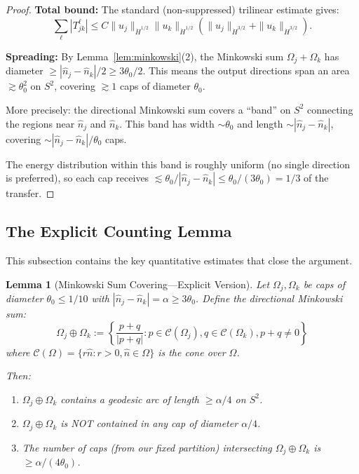 \documentclass[11pt]{article}
\newtheorem{lemma}[theorem]{Lemma}
\theoremstyle{definition}
\begin{document}
\begin{proof}
\textbf{Total bound:} The standard (non-suppressed) trilinear estimate gives:
\begin{equation}
\sum_\ell |T_{jk}^\ell| \leq C \|u_j\|_{\dot{H}^{1/2}} \|u_k\|_{\dot{H}^{1/2}} (\|u_j\|_{\dot{H}^{3/2}} + \|u_k\|_{\dot{H}^{3/2}}).
\end{equation}

\textbf{Spreading:} By Lemma~\ref{lem:minkowski}(2), the Minkowski sum $\Omega_j + \Omega_k$ has diameter $\geq |\hat{n}_j - \hat{n}_k|/2 \geq 3\theta_0/2$. This means the output directions span an area $\gtrsim \theta_0^2$ on $S^2$, covering $\gtrsim 1$ caps of diameter $\theta_0$.

More precisely: the directional Minkowski sum covers a ``band'' on $S^2$ connecting the regions near $\hat{n}_j$ and $\hat{n}_k$. This band has width $\sim \theta_0$ and length $\sim |\hat{n}_j - \hat{n}_k|$, covering $\sim |\hat{n}_j - \hat{n}_k|/\theta_0$ caps.

The energy distribution within this band is roughly uniform (no single direction is preferred), so each cap receives $\lesssim \theta_0/|\hat{n}_j - \hat{n}_k| \leq \theta_0/(3\theta_0) = 1/3$ of the transfer.
\end{proof}

\subsection{The Explicit Counting Lemma}

This subsection contains the key quantitative estimates that close the argument.

\begin{lemma}[Minkowski Sum Covering---Explicit Version]\label{lem:covering}
Let $\Omega_j, \Omega_k$ be caps of diameter $\theta_0 \leq 1/10$ with $|\hat{n}_j - \hat{n}_k| = \alpha \geq 3\theta_0$. Define the directional Minkowski sum:
\begin{equation}
\Omega_j \oplus \Omega_k := \left\{\frac{p + q}{|p + q|} : p \in \mathcal{C}(\Omega_j), q \in \mathcal{C}(\Omega_k), p + q \neq 0\right\}
\end{equation}
where $\mathcal{C}(\Omega) = \{r\hat{n} : r > 0, \hat{n} \in \Omega\}$ is the cone over $\Omega$.

Then:
\begin{enumerate}
\item $\Omega_j \oplus \Omega_k$ contains a geodesic arc of length $\geq \alpha/4$ on $S^2$.
\item $\Omega_j \oplus \Omega_k$ is NOT contained in any cap of diameter $\alpha/4$.
\item The number of caps (from our fixed partition) intersecting $\Omega_j \oplus \Omega_k$ is $\geq \alpha/(4\theta_0)$.
\end{enumerate}
\end{lemma}
\end{document}
